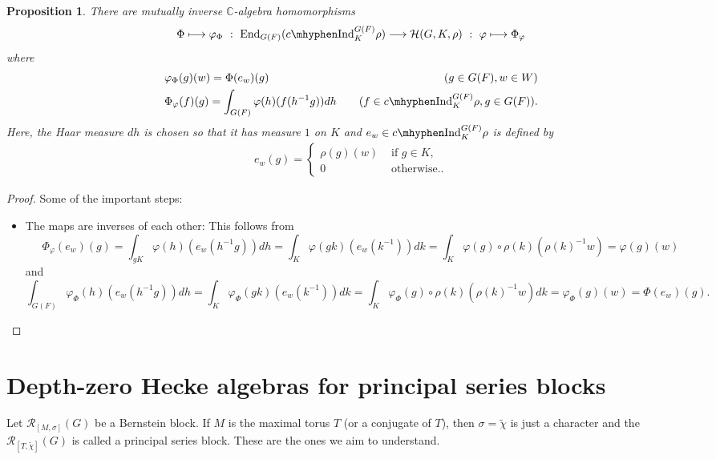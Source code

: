 \documentclass{article}
\newcommand{\End}{\mathrm{End}}
\newcommand{\cR}{\mathcal{R}}
\newcommand{\cH}{\mathcal{H}}
\newcommand{\CC}{\mathbb{C}}
\newcommand{\cInd}{c\mhyphen\mathrm{Ind}}
\theoremstyle{plain}
\newtheorem{proposition}[theorem]{Proposition}
\theoremstyle{definition}
\begin{document}
    \begin{proposition}
        There are mutually inverse $\CC$-algebra homomorphisms
        \begin{equation}
            \Phi\longmapsto \varphi_\Phi\ :\ \End_{G(F)}(\cInd_K^{G(F)}\rho)\longrightarrow\cH(G,K,\rho)\ :\ \varphi \longmapsto \Phi_\varphi
        \end{equation}
        where
        \begin{align*}
            &\varphi_\Phi(g)(w)=\Phi(e_w)(g)\quad & (g\in G(F), w\in W)\\
            &\Phi_\varphi(f)(g)=\int_{G(F)}\varphi(h)(f(h^{-1}g))dh \quad &(f\in\cInd_K^{G(F)}\rho, g\in G(F)).
        \end{align*}
        Here, the Haar measure $dh$ is chosen so that it has measure $1$ on $K$ and $e_w\in\cInd_K^{G(F)}\rho$ is defined by
        \begin{align*}
            e_w(g)=
            \begin{cases}
                \rho(g)(w) &\text{ if } g\in K,\\
                0 &\text{ otherwise.}.
            \end{cases}
        \end{align*}        
    \end{proposition}
    \begin{proof}
        Some of the important steps:
        \begin{itemize}
            \item The maps are inverses of each other: This follows from 
            $$\Phi_\varphi(e_w)(g)=\int_{gK}\varphi(h)(e_w(h^{-1}g))dh=\int_K\varphi(gk)(e_w(k^{-1}))dk=\int_K\varphi(g)\circ\rho(k)(\rho(k)^{-1}w)=\varphi(g)(w)$$
            and 
            $$\int_{G(F)}\varphi_\Phi(h)(e_w(h^{-1}g))dh=\int_{K}\varphi_\Phi(gk)(e_w(k^{-1}))dk=\int_{K}\varphi_\Phi(g)\circ\rho(k)(\rho(k)^{-1}w)dk=\varphi_\Phi(g)(w)=\Phi(e_w)(g).$$
        \end{itemize}
    \end{proof}

    \section{Depth-zero Hecke algebras for principal series blocks}
    Let $\cR_{[M,\sigma]}(G)$ be a Bernstein block. If $M$ is the maximal torus $T$ (or a conjugate of $T$), then $\sigma=\tilde\chi$ is just a character and the $\cR_{[T,\tilde\chi]}(G)$ is called a principal series block. These are the ones we aim to understand. 
\end{document}

